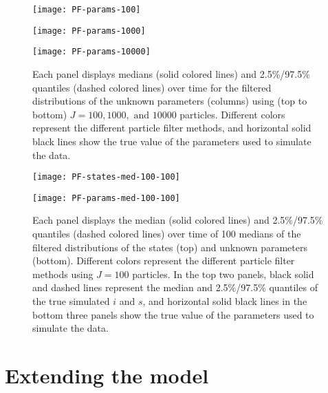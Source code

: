 \documentclass{article}
\begin{document}
\begin{figure}[ht]
\centering
\begin{minipage}{1.1\linewidth}
\texttt{[image: PF-params-100]}
\end{minipage}
\begin{minipage}{1.1\linewidth}
\texttt{[image: PF-params-1000]}
\end{minipage}
\begin{minipage}{1.1\linewidth}
\texttt{[image: PF-params-10000]}
\end{minipage}
\caption{Each panel displays medians (solid colored lines) and 2.5\%/97.5\% quantiles (dashed colored lines) over time for the filtered distributions of the unknown parameters (columns) using (top to bottom) $J = 100, 1000, \mbox{ and } 10000$ particles.  Different colors represent the different particle filter methods, and horizontal solid black lines show the true value of the parameters used to simulate the data.} \label{fig:params}
\end{figure}

\begin{figure}[ht]
\centering
\begin{minipage}{1.0\linewidth}
\texttt{[image: PF-states-med-100-100]}
\end{minipage}
\begin{minipage}{1.1\linewidth}
\texttt{[image: PF-params-med-100-100]}
\end{minipage}
\caption{Each panel displays the median (solid colored lines) and 2.5\%/97.5\% quantiles (dashed colored lines) over time of 100 medians of the filtered distributions of the states (top) and unknown parameters (bottom).  Different colors represent the different particle filter methods using $J = 100$ particles.  In the top two panels, black solid and dashed lines represent the median and 2.5\%/97.5\% quantiles of the true simulated $i$ and $s$, and horizontal solid black lines in the bottom three panels show the true value of the parameters used to simulate the data.} \label{fig:meds}
\end{figure}

\clearpage

\section{Extending the model \label{sec:extend}}
\end{document}
